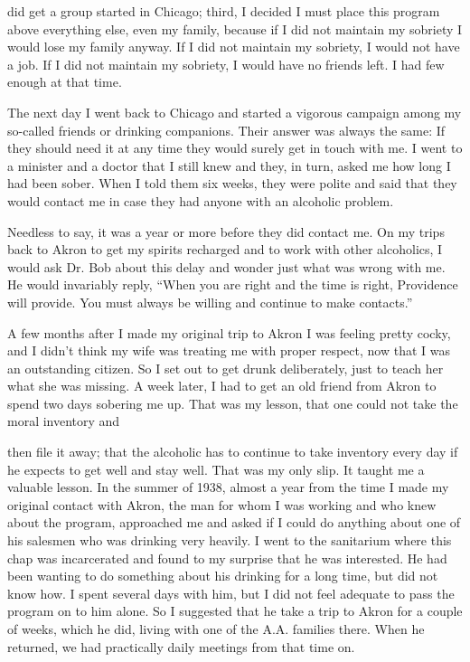 did get a group started in Chicago; third, I decided I must place this program above everything else, even my family, because if I did not maintain my sobriety I would lose my family anyway. If I did not maintain my sobriety, I would not have a job. If I did not maintain my sobriety, I would have no friends left. I had few enough at that time.

The next day I went back to Chicago and started a vigorous campaign among my so-called friends or drinking companions. Their answer was always the same: If they should need it at any time they would surely get in touch with me. I went to a minister and a doctor that I still knew and they, in turn, asked me how long I had been sober. When I told them six weeks, they were polite and said that they would contact me in case they had anyone with an alcoholic problem.

Needless to say, it was a year or more before they did contact me. On my trips back to Akron to get my spirits recharged and to work with other alcoholics, I would ask Dr. Bob about this delay and wonder just what was wrong with me. He would invariably reply, “When you are right and the time is right, Providence will provide. You must always be willing and continue to make contacts.”

A few months after I made my original trip to Akron I was feeling pretty cocky, and I didn’t think my wife was treating me with proper respect, now that I was an outstanding citizen. So I set out to get drunk deliberately, just to teach her what she was missing. A week later, I had to get an old friend from Akron to spend two days sobering me up. That was my lesson, that one could not take the moral inventory and

then file it away; that the alcoholic has to continue to take inventory every day if he expects to get well and stay well. That was my only slip. It taught me a valuable lesson. In the summer of 1938, almost a year from the time I made my original contact with Akron, the man for whom I was working and who knew about the program, approached me and asked if I could do anything about one of his salesmen who was drinking very heavily. I went to the sanitarium where this chap was incarcerated and found to my surprise that he was interested. He had been wanting to do something about his drinking for a long time, but did not know how. I spent several days with him, but I did not feel adequate to pass the program on to him alone. So I suggested that he take a trip to Akron for a couple of weeks, which he did, living with one of the A.A. families there. When he returned, we had practically daily meetings from that time on.

